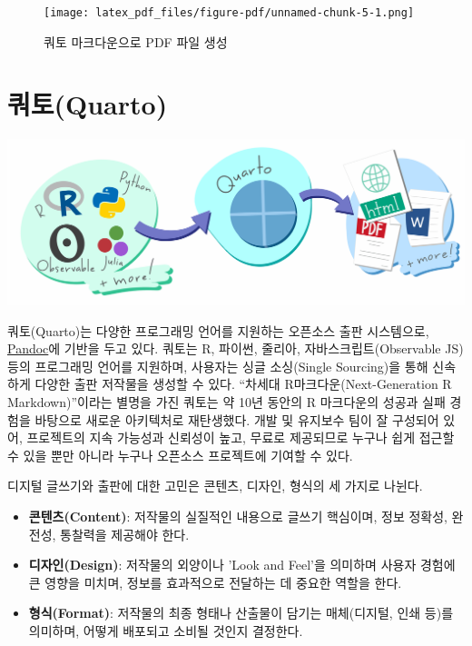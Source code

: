 \documentclass[
  letterpaper,
]{book}
\providecommand{\tightlist}{%
  \setlength{\itemsep}{0pt}\setlength{\parskip}{0pt}}\usepackage{longtable,booktabs,array}
\begin{document}
\begin{figure}

{\centering \texttt{[image: latex\_pdf\_files/figure-pdf/unnamed-chunk-5-1.png]}

}

\caption{쿼토 마크다운으로 PDF 파일 생성}

\end{figure}

\hypertarget{uxcffcuxd1a0quarto}{%
\chapter{쿼토(Quarto)}\label{uxcffcuxd1a0quarto}}

\includegraphics{images/horst_quarto_schematic.png}

쿼토(Quarto)는 다양한 프로그래밍 언어를 지원하는 오픈소스 출판
시스템으로, \href{https://pandoc.org/}{Pandoc}에 기반을 두고 있다.
쿼토는 R, 파이썬, 줄리아, 자바스크립트(Observable JS) 등의 프로그래밍
언어를 지원하며, 사용자는 싱글 소싱(Single Sourcing)을 통해 신속하게
다양한 출판 저작물을 생성할 수 있다. ``차세대 R마크다운(Next-Generation
R Markdown)''이라는 별명을 가진 쿼토는 약 10년 동안의 R 마크다운의
성공과 실패 경험을 바탕으로 새로운 아키텍처로 재탄생했다. 개발 및
유지보수 팀이 잘 구성되어 있어, 프로젝트의 지속 가능성과 신뢰성이 높고,
무료로 제공되므로 누구나 쉽게 접근할 수 있을 뿐만 아니라 누구나 오픈소스
프로젝트에 기여할 수 있다. \autocite{hyde2021single}

디지털 글쓰기와 출판에 대한 고민은 콘텐츠, 디자인, 형식의 세 가지로
나뉜다.

\begin{itemize}
\tightlist
\item
  \textbf{콘텐츠(Content)}: 저작물의 실질적인 내용으로 글쓰기 핵심이며,
  정보 정확성, 완전성, 통찰력을 제공해야 한다.
\item
  \textbf{디자인(Design)}: 저작물의 외양이나 'Look and Feel'을 의미하며
  사용자 경험에 큰 영향을 미치며, 정보를 효과적으로 전달하는 데 중요한
  역할을 한다.
\item
  \textbf{형식(Format)}: 저작물의 최종 형태나 산출물이 담기는
  매체(디지털, 인쇄 등)를 의미하며, 어떻게 배포되고 소비될 것인지
  결정한다.
\end{itemize}
\end{document}
